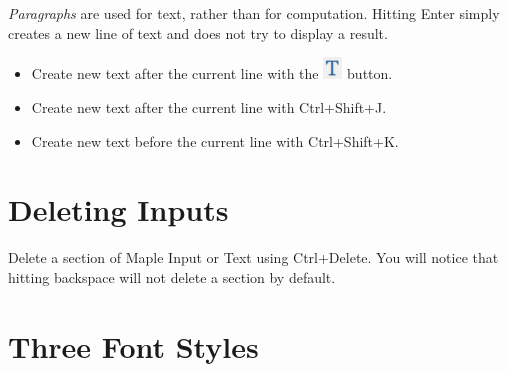 \textit{Paragraphs} are used for text, rather than for computation. Hitting Enter simply creates a new line of text and does not try to display a result.
\begin{itemize}
\item Create new text after the current line with the \includegraphics[width=0.04\textwidth]{tutorials/figures/new_text.PNG} button.
\item Create new text after the current line with Ctrl+Shift+J.
\item Create new text before the current line with Ctrl+Shift+K.
\end{itemize}

\section{Deleting Inputs}

Delete a section of Maple Input or Text using Ctrl+Delete. You will notice that hitting backspace will not delete a section by default.

\section{Three Font Styles}

